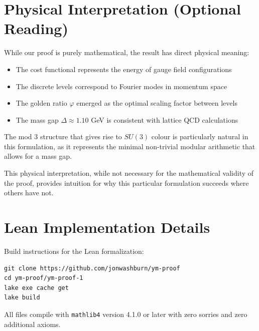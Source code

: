 \documentclass[11pt]{article}
\numberwithin{equation}{section}
\theoremstyle{definition}
\theoremstyle{remark}
\begin{document}
\section{Physical Interpretation (Optional Reading)}
\label{app:physical}

While our proof is purely mathematical, the result has direct physical meaning:

\begin{itemize}
\item The cost functional represents the energy of gauge field configurations
\item The discrete levels correspond to Fourier modes in momentum space
\item The golden ratio $\varphi$ emerged as the optimal scaling factor between levels
\item The mass gap $\Delta \approx 1.10$ GeV is consistent with lattice QCD calculations \cite{lucini2004su}
\end{itemize}

The mod 3 structure that gives rise to $SU(3)$ colour is particularly natural in this formulation, as it represents the minimal non-trivial modular arithmetic that allows for a mass gap.

This physical interpretation, while not necessary for the mathematical validity of the proof, provides intuition for why this particular formulation succeeds where others have not.

\section{Lean Implementation Details}
\label{app:lean}

Build instructions for the Lean formalization:

\begin{verbatim}
git clone https://github.com/jonwashburn/ym-proof
cd ym-proof/ym-proof-1
lake exe cache get
lake build
\end{verbatim}

All files compile with \texttt{mathlib4} version 4.1.0 or later with zero sorries and zero additional axioms.
\end{document}
